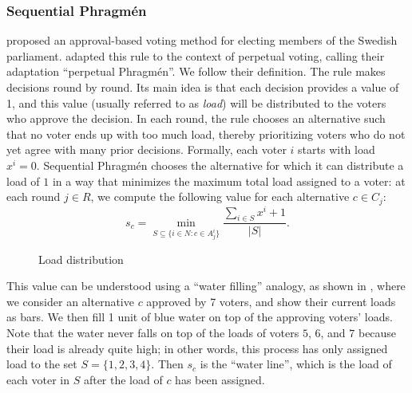 \documentclass[10pt]{scrartcl}
\theoremstyle{plain}
\theoremstyle{definition}
\begin{document}
\subsubsection{Sequential Phragm\'en}
\citet{Phra94a} proposed an approval-based voting method for electing members of the Swedish parliament. \citet{lacknermaly2023} adapted this rule to the context of perpetual voting, calling their adaptation ``perpetual Phragm\'en''. We follow their definition. The rule makes decisions round by round. Its main idea is that each decision provides a value of 1, and this value (usually referred to as \emph{load}) will be distributed to the voters who approve the decision. In each round, the rule chooses an alternative such that no voter ends up with too much load, thereby prioritizing voters who do not yet agree with many prior decisions. Formally, each voter $i$ starts with load $x^i=0$. Sequential Phragm\'en chooses the alternative for which it can distribute a load of $1$ in a way that minimizes the maximum total load assigned to a voter: at each round $j \in R$, we compute the following value for each alternative $c \in C_j$: 
\[ s_c = \min_{S \subseteq \{ i \in N : c \in A^i_j \}}  \frac{\sum_{i \in S} x^i + 1}{|S|}.\] 
\begin{figure}
	\vspace{-66pt}
	\centering
	\vspace{-7pt}
	\caption{Load distribution}
	\label{fig:load}
\end{figure}
This value can be understood using a ``water filling'' analogy, as shown in , where we consider an alternative $c$ approved by 7 voters, and show their current loads as bars. We then fill 1 unit of blue water on top of the approving voters' loads. Note that the water never falls on top of the loads of voters $5$, $6$, and $7$ because their load is already quite high; in other words, this process has only assigned load to the set $S = \{1,2,3,4\}$. Then $s_c$ is the ``water line'', which is the load of each voter in $S$ after the load of $c$ has been assigned.
\end{document}
